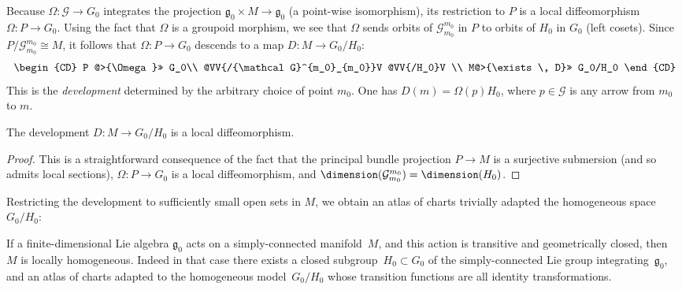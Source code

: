 Because $\Omega \colon {\mathcal G} \rightarrow G_0$ integrates the
projection ${\mathfrak g}_0 \times M \rightarrow {\mathfrak g}_0$ (a
point-wise isomorphism), its restriction to $P$ is a local
dif\/feomorphism $\Omega \colon P\rightarrow G_0$. Using the fact that
$\Omega$ is a groupoid morphism, we see that $\Omega$ sends orbits of
${\mathcal G}^{m_0}_{m_0}$ in $P$ to orbits of $H_0$ in $G_0$ (left
cosets). Since $P/{\mathcal G}^{m_0}_{m_0}\cong M$, it follows that
$\Omega\colon P\rightarrow G_0$ descends to a map $D \colon
M\rightarrow G_0/H_0$:
\begin{gather*}
  \begin{CD}
    P   @>{\Omega}>> G_0\\
    @VV{/{\mathcal G}^{m_0}_{m_0}}V @VV{/H_0}V \\
    M@>{\exists\, D}>> G_0/H_0
  \end{CD}
\end{gather*}
This is the {\it development} determined by the arbitrary choice of
point $m_0$. One has $D(m)=\Omega(p)H_0$, where $p \in {\mathcal G}$
is any arrow from $m_0$ to $m$.
\begin{PropositionBlaom}\label{Proposition4.3}
  The development $D \colon M \rightarrow {G_0/H_0}$ is a local
  diffeomorphism.
\end{PropositionBlaom}

\begin{proof}
  This is a straightforward consequence of the fact that the principal
  bundle projection $P \rightarrow M$ is a surjective submersion (and
  so admits local sections), $\Omega \colon P \rightarrow G_0$ is a
  local dif\/feomorphism, and $\dimension ({\mathcal
    G}^{m_0}_{m_0})=\dimension (H_0)$.
\end{proof}

Restricting the development to suf\/f\/iciently small open sets in $M$, we
obtain an atlas of charts trivially adapted the homogeneous space
${G_0/H_0}$:
\begin{CorollaryBlaom}\label{Corollary4.4}
  If a finite-dimensional Lie algebra ${\mathfrak g}_0$ acts on a
  simply-connected manifold~$M$, and this action is transitive and
  geometrically closed, then~$M$ is locally homogeneous. Indeed in
  that case there exists a closed subgroup~$H_0 \subset G_0$ of the
  simply-connected Lie group integrating~${\mathfrak g}_0$, and an
  atlas of charts adapted to the homogeneous model~$G_0/H_0$ whose
  transition functions are all identity transformations.
\end{CorollaryBlaom}

